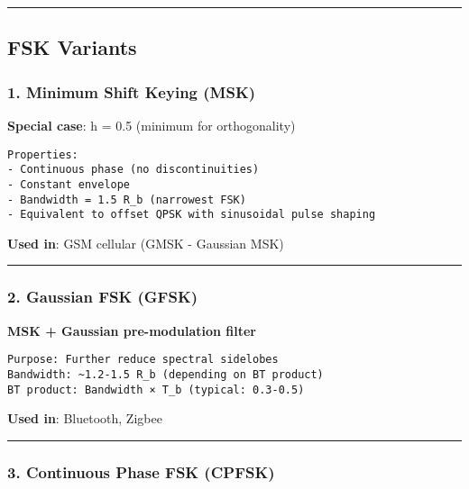 \begin{center}\rule{0.5\linewidth}{0.5pt}\end{center}

\subsection{\texorpdfstring{ FSK
Variants}{ FSK Variants}}\label{fsk-variants}

\subsubsection{1. Minimum Shift Keying
(MSK)}\label{minimum-shift-keying-msk}

\textbf{Special case}: h = 0.5 (minimum for orthogonality)

\begin{verbatim}
Properties:
- Continuous phase (no discontinuities)
- Constant envelope
- Bandwidth = 1.5 R_b (narrowest FSK)
- Equivalent to offset QPSK with sinusoidal pulse shaping
\end{verbatim}

\textbf{Used in}: GSM cellular (GMSK - Gaussian MSK)

\begin{center}\rule{0.5\linewidth}{0.5pt}\end{center}

\subsubsection{2. Gaussian FSK (GFSK)}\label{gaussian-fsk-gfsk}

\textbf{MSK + Gaussian pre-modulation filter}

\begin{verbatim}
Purpose: Further reduce spectral sidelobes
Bandwidth: ~1.2-1.5 R_b (depending on BT product)
BT product: Bandwidth × T_b (typical: 0.3-0.5)
\end{verbatim}

\textbf{Used in}: Bluetooth, Zigbee

\begin{center}\rule{0.5\linewidth}{0.5pt}\end{center}

\subsubsection{3. Continuous Phase FSK
(CPFSK)}\label{continuous-phase-fsk-cpfsk}

